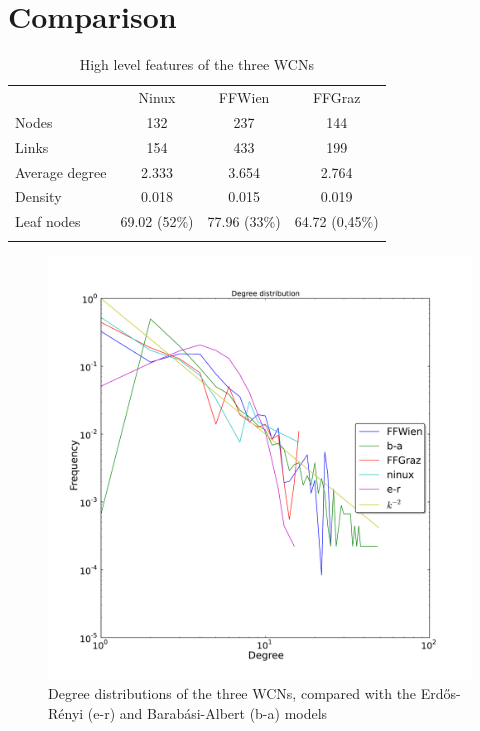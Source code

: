 \documentclass[oneside,openany]{memoir}
\begin{document}
\section{Comparison}\label{comparison}

\begin{longtable}[c]{@{}lccc@{}}
\toprule\addlinespace
& Ninux & FFWien & FFGraz
\\\addlinespace
\midrule\endhead
Nodes & 132 & 237 & 144
\\\addlinespace
Links & 154 & 433 & 199
\\\addlinespace
Average degree & 2.333 & 3.654 & 2.764
\\\addlinespace
Density & 0.018 & 0.015 & 0.019
\\\addlinespace
Leaf nodes & 69.02 (52\%) & 77.96 (33\%) & 64.72 (0,45\%)
\\\addlinespace
\bottomrule
\addlinespace
\caption{High level features of the three WCNs}
\end{longtable}

\begin{figure}[htb]
\centering
\includegraphics{graphs/degree_distribution.pdf}
\caption{Degree distributions of the three WCNs, compared with the
Erd\H{o}s-Rényi (e-r) and Barabási-Albert (b-a) models}
\label{fig:wcn-degree-distribution}
\end{figure}
\end{document}
